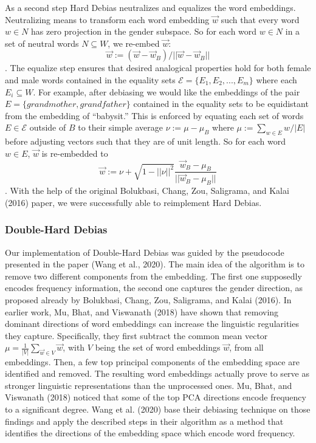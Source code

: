 \documentclass[
  english,
  man,floatsintext]{apa6}
\begin{document}
As a second step Hard Debias neutralizes and equalizes the word embeddings. Neutralizing means to transform each word embedding \(\vec{w}\) such that every word \(w\in N\) has zero projection in the gender subspace. So for each word \(w\in N\) in a set of neutral words \(N \subseteq W\), we re-embed \(\vec{w}\): \[\vec{w}:=(\vec{w}-\vec{w}_B)/||\vec{w}-\vec{w}_B||\]. The equalize step ensures that desired analogical properties hold for both female and male words contained in the equality sets \(\mathcal{E}=\{E_1,E_2,...,E_m\}\) where each \(E_i \subseteq W\). For example, after debiasing we would like the embeddings of the pair \(E=\{grandmother, grandfather\}\) contained in the equality sets to be equidistant from the embedding of ``babysit.'' This is enforced by equating each set of words \(E\in \mathcal{E}\) outside of \(B\) to their simple average \(\nu:=\mu-\mu_B\) where \(\mu:=\sum_{w\in E}w/|E|\) before adjusting vectors such that they are of unit length. So for each word \(w\in E\), \(\vec{w}\) is re-embedded to \[\vec{w}:=\nu+\sqrt{1-||\nu||^2}\frac{\vec{w}_B-\mu_B}{||\vec{w}_B-\mu_B||}\].
With the help of the original Bolukbasi, Chang, Zou, Saligrama, and Kalai (2016) paper, we were successfully able to reimplement Hard Debias.

\hypertarget{double-hard-debias}{%
\subsubsection{Double-Hard Debias}\label{double-hard-debias}}

Our implementation of Double-Hard Debias was guided by the pseudocode presented in the paper (Wang et al., 2020).
The main idea of the algorithm is to remove two different components from the embedding. The first one supposedly encodes frequency information, the second one captures the gender direction, as proposed already by Bolukbasi, Chang, Zou, Saligrama, and Kalai (2016).
In earlier work, Mu, Bhat, and Viswanath (2018) have shown that removing dominant directions of word embeddings can increase the linguistic regularities they capture. Specifically, they first subtract the common mean vector \(\mu = \frac{1}{|V|}\sum_{\vec{w} \in V}\vec{w}\), with \(V\) being the set of word embeddings \(\vec{w}\), from all embeddings. Then, a few top principal components of the embedding space are identified and removed. The resulting word embeddings actually prove to serve as stronger linguistic representations than the unprocessed ones. Mu, Bhat, and Viswanath (2018) noticed that some of the top PCA directions encode frequency to a significant degree. Wang et al. (2020) base their debiasing technique on those findings and apply the described steps in their algorithm as a method that identifies the directions of the embedding space which encode word frequency.
\end{document}
